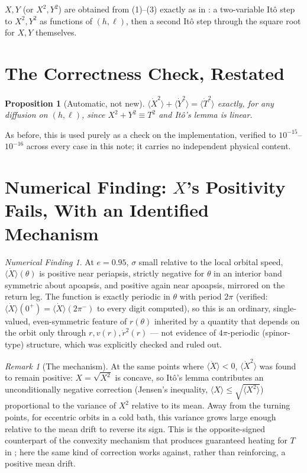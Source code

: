 \documentclass[12pt]{amsart}
\theoremstyle{plain}
\newtheorem{proposition}[theorem]{Proposition}
\theoremstyle{remark}
\newtheorem*{remark}{Remark}
\newtheorem*{finding}{Numerical Finding}
\begin{document}
$X,Y$ (or $X^2,Y^2$) are obtained from (1)--(3) exactly as in \cite{Ebert2026Cancellation}: a two-variable It\^o step to $X^2,Y^2$ as functions of $(h,\ell)$, then a second It\^o step through the square root for $X,Y$ themselves.

\section{The Correctness Check, Restated}

\begin{proposition}[Automatic, not new]\label{prop:identity}
$\langle\dot X^2\rangle+\langle\dot Y^2\rangle=\langle\dot T^2\rangle$ exactly, for any diffusion on $(h,\ell)$, since $X^2+Y^2\equiv T^2$ and It\^o's lemma is linear.
\end{proposition}

As before, this is used purely as a check on the implementation, verified to $10^{-15}$--$10^{-16}$ across every case in this note; it carries no independent physical content.

\section{Numerical Finding: $X$'s Positivity Fails, With an Identified Mechanism}

\begin{finding}\label{find:Xfails}
At $e=0.95$, $\sigma$ small relative to the local orbital speed, $\langle\dot X\rangle(\theta)$ is positive near periapsis, strictly negative for $\theta$ in an interior band symmetric about apoapsis, and positive again near apoapsis, mirrored on the return leg. The function is exactly periodic in $\theta$ with period $2\pi$ (verified: $\langle\dot X\rangle(0^+)=\langle\dot X\rangle(2\pi^-)$ to every digit computed), so this is an ordinary, single-valued, even-symmetric feature of $r(\theta)$ inherited by a quantity that depends on the orbit only through $r,v(r),\dot r^2(r)$ --- not evidence of $4\pi$-periodic (spinor-type) structure, which was explicitly checked and ruled out.
\end{finding}

\begin{remark}[The mechanism]
At the same points where $\langle\dot X\rangle<0$, $\langle\dot X^2\rangle$ was found to remain positive: $X=\sqrt{X^2}$ is concave, so It\^o's lemma contributes an unconditionally negative correction (Jensen's inequality, $\langle X\rangle\leq\sqrt{\langle X^2\rangle}$) proportional to the variance of $X^2$ relative to its mean. Away from the turning points, for eccentric orbits in a cold bath, this variance grows large enough relative to the mean drift to reverse its sign. This is the opposite-signed counterpart of the convexity mechanism that produces guaranteed heating for $T$ in \cite{Ebert2026Cancellation}; here the same kind of correction works against, rather than reinforcing, a positive mean drift.
\end{remark}
\end{document}
